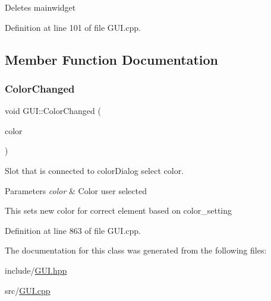 Deletes mainwidget 

Definition at line 101 of file G\+U\+I.\+cpp.



\subsection{Member Function Documentation}
\mbox{\label{classGUI_a38e10347906d9b19c2970a8cef79a455}} 
\subsubsection{\texorpdfstring{Color\+Changed}{ColorChanged}}
{\footnotesize\ttfamily void G\+U\+I\+::\+Color\+Changed (\begin{DoxyParamCaption}\item[{const Q\+Color \&}]{color }\end{DoxyParamCaption})\hspace{0.3cm}{\ttfamily [slot]}}



Slot that is connected to color\+Dialog select color. 


\begin{DoxyParams}{Parameters}
{\em color} & Color user selected\\
\hline
\end{DoxyParams}
This sets new color for correct element based on color\+\_\+setting 

Definition at line 863 of file G\+U\+I.\+cpp.



The documentation for this class was generated from the following files\+:\begin{DoxyCompactItemize}
\item 
include/\mbox{\hyperlink{GUI_8hpp}{G\+U\+I.\+hpp}}\item 
src/\mbox{\hyperlink{GUI_8cpp}{G\+U\+I.\+cpp}}\end{DoxyCompactItemize}
